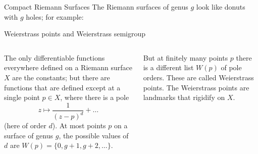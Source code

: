 \documentclass[12pt, aspectratio=169]{beamer}
\begin{document}
\begin{frame}{Compact Riemann Surfaces}
The Riemann surfaces of \alert{genus $g$} look like donuts with $g$ holes; for example:
\end{frame}


\begin{frame}{Weierstrass points and Weierstrass semigroup}
\begin{columns}
 The only differentiable functions
 everywhere defined on a Riemann surface $X$ are the constants;
 but there are functions that are defined except
 at a \alert{single point} $p\in X$, where there is a pole 
 $$
 z\mapsto \frac{1}{(z-p)^d} + \dots
 $$
 (here of order $d$). At most points $p$ on a surface of
 genus $g$, the possible values of $d$ are
$W(p) = \{0, g+1,g+2,\dots\}$.

But at finitely many points $p$
there is a different list $W(p)$ of pole orders. These are called \alert{Weierstrass points}.
The Weierstrass points are landmarks that rigidify on $X$.
\end{columns}
 \end{frame}
\end{document}
